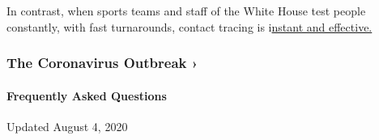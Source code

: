 In contrast, when sports teams and staff of the White House test people
constantly, with fast turnarounds, contact tracing is
i\href{https://www.nbcnews.com/politics/white-house/white-house-executive-office-cafeteria-closed-after-positive-coronavirus-test-n1234662?cid=sm_npd_nn_tw_ma}{nstant
and effective.}

\href{https://www.nytimes.com/news-event/coronavirus?action=click\&pgtype=Article\&state=default\&region=MAIN_CONTENT_3\&context=storylines_faq}{}

\hypertarget{the-coronavirus-outbreak-}{%
\subsubsection{The Coronavirus Outbreak
›}\label{the-coronavirus-outbreak-}}

\hypertarget{frequently-asked-questions}{%
\paragraph{Frequently Asked
Questions}\label{frequently-asked-questions}}

Updated August 4, 2020

